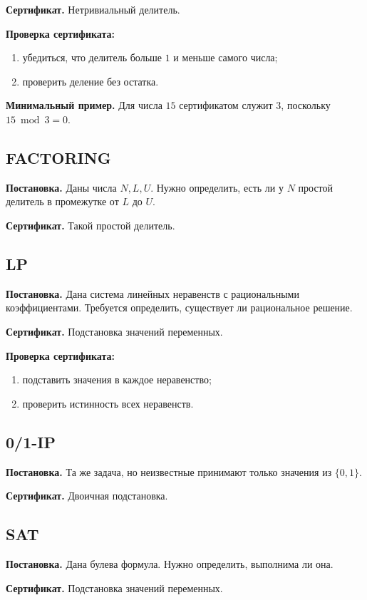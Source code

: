\documentclass[12pt,a4paper]{article}
\theoremstyle{definition}
\theoremstyle{plain}
\begin{document}
\textbf{Сертификат.} Нетривиальный делитель.

\textbf{Проверка сертификата:}
\begin{enumerate}
\item убедиться, что делитель больше $1$ и меньше самого числа;
\item проверить деление без остатка.
\end{enumerate}

\textbf{Минимальный пример.}
Для числа $15$ сертификатом служит $3$, поскольку $15\bmod 3=0$.

\subsection{\textsc{FACTORING}}
\textbf{Постановка.} Даны числа $N,L,U$. Нужно определить, есть ли у $N$ простой делитель в промежутке от $L$ до $U$.

\textbf{Сертификат.} Такой простой делитель.

\subsection{\textsc{LP}}
\textbf{Постановка.} Дана система линейных неравенств с рациональными коэффициентами. Требуется определить, существует ли рациональное решение.

\textbf{Сертификат.} Подстановка значений переменных.

\textbf{Проверка сертификата:}
\begin{enumerate}
\item подставить значения в каждое неравенство;
\item проверить истинность всех неравенств.
\end{enumerate}

\subsection{\textsc{0/1-IP}}
\textbf{Постановка.} Та же задача, но неизвестные принимают только значения из $\{0,1\}$.

\textbf{Сертификат.} Двоичная подстановка.

\subsection{\textsc{SAT}}
\textbf{Постановка.} Дана булева формула. Нужно определить, выполнима ли она.

\textbf{Сертификат.} Подстановка значений переменных.
\end{document}
